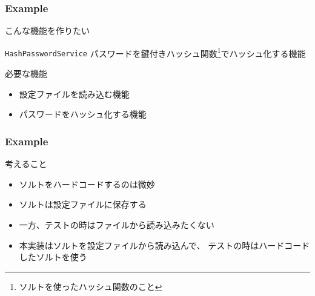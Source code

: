 \begin{frame}
  \frametitle{Example}

  こんな機能を作りたい

  \pause

  \begin{exampleblock}{\texttt{HashPasswordService}}
    パスワードを鍵付きハッシュ関数\footnote[frame]{ソルトを使ったハッシュ関数のこと}でハッシュ化する機能
  \end{exampleblock}

  \pause

  \begin{block}{必要な機能}
    \begin{itemize}
      \item<4-> 設定ファイルを読み込む機能
      \item<5-> パスワードをハッシュ化する機能
    \end{itemize}
  \end{block}

  \begin{center}
  \end{center}
\end{frame}


\begin{frame}
  \frametitle{Example}

  \begin{block}{考えること}
    \begin{itemize}
      \item<2-> ソルトをハードコードするのは微妙
      \item<3-> ソルトは設定ファイルに保存する
      \item<4-> 一方、テストの時はファイルから読み込みたくない
        \begin{center}
        \end{center}
      \item<6-> 本実装はソルトを設定ファイルから読み込んで、
        テストの時はハードコードしたソルトを使う
        \begin{center}
        \end{center}
    \end{itemize}
  \end{block}
\end{frame}

